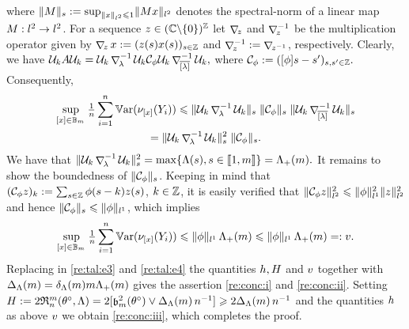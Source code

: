 \begin{pro}
   where $\Vnorm[s]{M}:=\sup_{\Vnormlp{x}\leq 1}\Vnormlp{Mx}$ denotes
   the spectral-norm of a linear map $M:\lp^2\to\lp^2$. For a sequence
   $z\in(\Cz\backslash\{0\})^\Zz$ let $\Diag{z}$ and $\Diag{z}^{-1}$ be
   the multiplication operator given by $\Diag{z}x:=\Zsuite{z(s) x(s)}$
   and $\Diag{z}^{-1}:=\Diag{z^{-1}}$, respectively.  Clearly, we have
   $\DiPro[k]A\DiPro[k] = \DiPro[k]\Diag{\fedf}^{-1} \DiPro[k]
   \cC_{\fydf} \DiPro[k] \Diag {\ofedf}^{-1}\DiPro[k],$ where
   $ \cC_{\fydf} := \Zsuite[s,s']{\fou[s-s']{\ydf}}.$ Consequently,
   \begin{multline*}
     \sup_{\He\in\mBaH}\tfrac{1}{\ssY}\sum_{i=1}^{\ssY}\Var(\nu_{\He}(Y_i))
     \leq \Vnorm[s]{\DiPro[k]\Diag{\fedf}^{-1} \DiPro[k]}\;
     \Vnorm[s]{ \cC_{\fydf}}\;\Vnorm[s]{\DiPro[k]\Diag{\ofedf}^{-1} \DiPro[k]}\\=
     \Vnorm[s]{\DiPro[k]\Diag{\fedf}^{-1} \DiPro[k]}^2\; \Vnorm[s]{\cC_{\fydf}}.
   \end{multline*}
   We have that
   $\Vnorm[s]{\DiPro[k]\Diag{\fedf}^{-1} \DiPro[k]}^2=
   \max\{\iSv[s],s\in\nset{1,\Di}\}=\miSv.$ It remains to show the
   boundedness of $\Vnorm[s]{\cC_{\fydf}}$.  Keeping in mind that
   $(\cC_{\fydf}z)_k:= \sum_{s\in\Zz}\fydf[(s-k)]z(s)$, $k\in\Zz$, it is
   easily verified that
   $\Vnormlp{\cC_{\fydf} z}^2\leq \Vnormlp[1]{\fydf}^2\Vnormlp{z}^2$
   and hence $ \Vnorm[s]{\cC_{\fydf}}\leq\Vnormlp[1]{\fydf}$, which
   implies
   \begin{equation*}
     \sup_{\He\in\mBaH}\tfrac{1}{\ssY}\sum_{i=1}^{\ssY}\Var(\nu_{\He}(Y_i))\leq\Vnormlp[1]{\fydf}\,\miSv\leq\Vnormlp[1]{\fydf}\,\miSv=:\Tcv.
   \end{equation*}
   Replacing in  \eqref{re:tal:e3} and \eqref{re:tal:e4}
   the quantities $\Tch,\TcH$ and $\Tcv$ together with
   $\DipenSv=\cmSv\Di\miSv$ gives the assertion \ref{re:conc:i} and
   \ref{re:conc:ii}. Setting
   $\TcH:=2\daRa{\Di}{(\xdf,\Lambda)}=2[\bias^2(\xdf)\vee
   \DipenSv\,\ssY^{-1}]\geq 2\DipenSv\,\ssY^{-1}$ and the quantities
   $\Tch$ as above $\Tcv$ we obtain \ref{re:conc:iii}, which completes the
   proof.\proEnd
 \end{pro}
 
